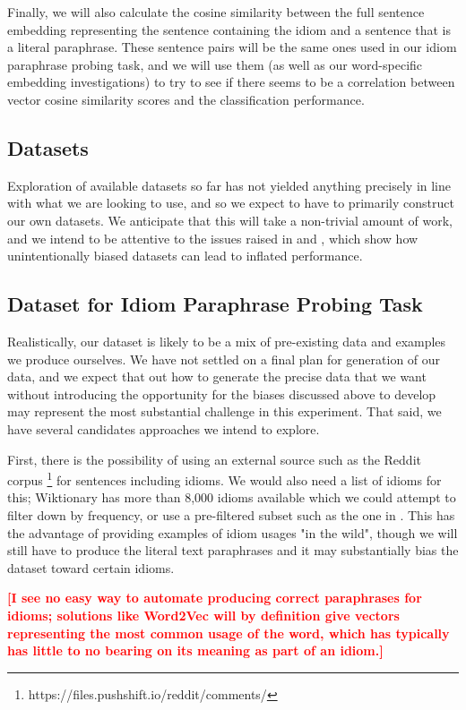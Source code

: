 \documentclass[11pt,a4paper]{article}
\newcommand{\comment}[1]{\textcolor{red}{\bf \small [#1]}}
\begin{document}
 Finally, we will also calculate the cosine similarity between the full sentence embedding representing the sentence containing the idiom and a sentence that is a literal paraphrase. These sentence pairs will be the same ones used in our idiom paraphrase probing task, and we will use them (as well as our word-specific embedding investigations) to try to see if there seems to be a correlation between vector cosine similarity scores and the classification performance.

\subsection{Datasets}
Exploration of available datasets so far has not yielded anything precisely in line with what we are looking to use, and so we expect to have to primarily construct our own datasets. We anticipate that this will take a non-trivial amount of work, and we intend to be attentive to the issues raised in \citep{niven2019probing} and \citep{mccoy2019right}, which show how unintentionally biased datasets can lead to inflated performance.

\subsection{Dataset for Idiom Paraphrase Probing Task}
\vspace{5mm}
Realistically, our dataset is likely to be a mix of pre-existing data and examples we produce ourselves. We have not settled on a final plan for generation of our data, and we expect that out how to generate the precise data that we want without introducing the opportunity for the biases discussed above to develop may represent the most substantial challenge in this experiment. That said, we have several candidates approaches we intend to explore.

First, there is the possibility of using an external source such as the Reddit corpus \footnote{https://files.pushshift.io/reddit/comments/} for sentences including idioms. We would also need a list of idioms for this; Wiktionary has more than 8,000 idioms available which we could attempt to filter down by frequency, or use a pre-filtered subset such as the one in \cite{Jochim2018SLIDEA}. This has the advantage of providing examples of idiom usages "in the wild", though we will still have to produce the literal text paraphrases and it may substantially bias the dataset toward certain idioms. 

\comment{I see no easy way to automate producing correct paraphrases for idioms; solutions like Word2Vec will by definition give vectors representing the most common usage of the word, which has typically has little to no bearing on its meaning as part of an idiom.}
\end{document}
